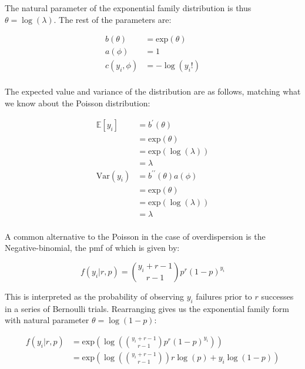 \documentclass{report}
\begin{document}
The natural parameter of the exponential family distribution is thus $\theta = \log(\lambda)$. The rest of the parameters are:

\begin{equation}\label{eq:ex-glm-poisson-dist-params}
    \begin{aligned}
        b(\theta) &= \text{exp}(\theta) \\
        a(\phi) &= 1 \\
        c(y_i, \phi) &= -\log(y_i!) \\
    \end{aligned}
\end{equation}

The expected value and variance of the distribution are as follows, matching what we know about the Poisson distribution:

\begin{equation}\label{eq:ex-glm-poisson-dist-mean-var}
    \begin{aligned}
        \mathbb{E}[y_i] 
          &= b^\prime(\theta) \\
          &= \text{exp}(\theta) \\
          &= \text{exp}(\log(\lambda)) \\
          &= \lambda \\
        \text{Var}(y_i)
          &= b^{\prime\prime}(\theta)a(\phi) \\
          &= \text{exp}(\theta) \\
          &= \text{exp}(\log(\lambda)) \\
          &= \lambda \\
    \end{aligned}
\end{equation}

A common alternative to the Poisson in the case of overdispersion is the Negative-binomial, the \gls{pmf} of which is given by:

\begin{equation}\label{eq:ex-glm-nb-dist}
    f(y_i|r, p) = \binom{y_i+r-1}{r-1} p^r (1-p)^{y_i}
\end{equation}

This is interpreted as the probability of observing $y_i$ failures prior to $r$ successes in a series of Bernoulli trials. Rearranging gives us the exponential family form with natural parameter $\theta = \log(1-p)$:

\begin{equation}\label{eq:ex-glm-nb-dist-exp-form}
    \begin{aligned}
        f(y_i|r,p)
          &= \text{exp}\left(\log\left(\binom{y_i+r-1}{r-1} p^r (1-p)^{y_i}\right)\right) \\
          &= \text{exp}\left(\log\left(\binom{y_i+r-1}{r-1}\right) r\log(p) + y_i\log(1-p)\right) \\
    \end{aligned}
\end{equation}
\end{document}
